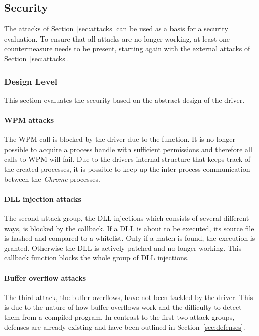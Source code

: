 \subsection{Security}
\label{sec:security}
The attacks of Section~\ref{sec:attacks} can be used as a basis for a security evaluation. To ensure that all attacks are no longer working, at least one countermeasure needs to be present, starting again with the external attacks of Section~\ref{sec:attacks}. 

\subsubsection{Design Level}
This section evaluates the security based on the abstract design of the driver.
\paragraph{\gls{WPM} attacks}
The \gls{WPM} call is blocked by the driver due to the  function. It is no longer possible to acquire a process handle with sufficient permissions and therefore all calls to \gls{WPM} will fail. Due to the drivers internal structure that keeps track of the created processes, it is possible to keep up the inter process communication between the \emph{Chrome} processes. 

\paragraph{\gls{DLL} injection attacks}
The second attack group, the \gls{DLL} injections which consists of several different ways, is blocked by the  callback. If a \gls{DLL} is about to be executed, its source file is hashed and compared to a whitelist. Only if a match is found, the execution is granted. Otherwise the \gls{DLL} is actively patched and no longer working. This callback function blocks the whole group of \gls{DLL} injections.

\paragraph{Buffer overflow attacks}
The third attack, the buffer overflows, have not been tackled by the driver. This is due to the nature of how buffer overflows work and the difficulty to detect them from a compiled program. In contrast to the first two attack groups, defenses are already existing and have been outlined in Section~\ref{sec:defenses}.

